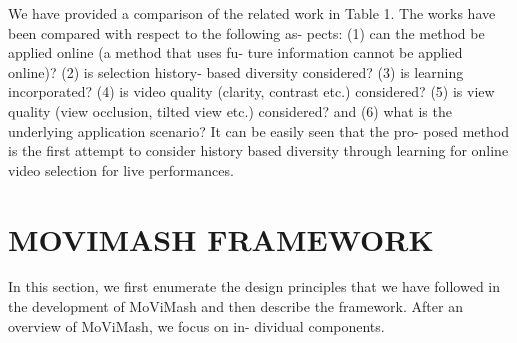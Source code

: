 \documentclass{sig-alternate}
\begin{document}
We have provided a comparison of the related work in Table 1.
The works have been compared with respect to the following as-
pects: (1) can the method be applied online (a method that uses fu-
ture information cannot be applied online)? (2) is selection history-
based diversity considered? (3) is learning incorporated? (4) is
video quality (clarity, contrast etc.) considered? (5) is view quality
(view occlusion, tilted view etc.) considered? and (6) what is the
underlying application scenario? It can be easily seen that the pro-
posed method is the first attempt to consider history based diversity
through learning for online video selection for live performances.\par

\section{MOVIMASH FRAMEWORK}
\par In this section, we first enumerate the design principles that we
have followed in the development of MoViMash and then describe
the framework. After an overview of MoViMash, we focus on in-
dividual components.
\end{document}
